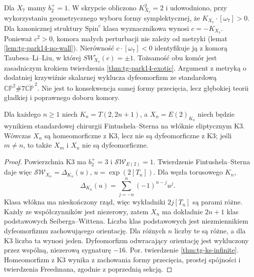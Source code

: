 \begin{przyklad}
Dla $X_7$ mamy $b_2^+=1$. W skrypcie obliczono
$K_{X_7}^2=2$ i udowodniono, przy wykorzystaniu
geometrycznego wyboru formy symplektycznej, że
$K_{X_7}\cdot[\omega_7]>0$. Dla kanonicznej struktury $\mathrm{Spin}^c$
klasa wyznacznikowa wynosi $c=-K_{X_7}$.
Ponieważ $c^2>0$, komora małych perturbacji
nie zależy od metryki (lemat
\ref{lem:tg-park14-no-wall}). Nierówność
$c\cdot[\omega_7]<0$ identyfikuje ją z komorą
Taubesa--Li--Liu, w której
$SW_{X_7}^{\circ}(c)=\pm1$.
Tożsamość obu komór jest zasadniczym krokiem
twierdzenia \ref{thm:tg-park14-exotic}. Argument z metryką
o dodatniej krzywiźnie skalarnej wyklucza dyfeomorfizm
ze standardową $\mathbb{CP}^2\#7\overline{\mathbb{CP}}^{\,2}$.
Nie jest to konsekwencja samej formy przecięcia, lecz
głębokiej teorii gładkiej i poprawnego doboru komory.
\end{przyklad}

\begin{twierdzenie}
\label{thm:tg-syn-k3}
Dla każdego $n\ge1$ niech $K_n=T(2,2n+1)$,
a $X_n=E(2)_{K_n}$ niech będzie wynikiem standardowej
chirurgii Fintushela--Sterna na włóknie eliptycznym K3.
Wówczas $X_n$ są homeomorficzne z K3, lecz nie są
dyfeomorficzne z K3; jeśli $m\ne n$,
to także $X_m$ i $X_n$ nie są dyfeomorficzne.
\end{twierdzenie}

\begin{proof}
Powierzchnia K3 ma $b_2^+=3$ i $\mathcal{SW}_{E(2)}=1$.
Twierdzenie Fintushela--Sterna daje więc
$\mathcal{SW}_{X_n}=\Delta_{K_n}(u)$,
$u=\exp(2[T_n])$. Dla węzła torusowego $K_n$,
\[
 \Delta_{K_n}(u)=\sum_{j=-n}^n(-1)^{n-j}u^j.
\]
Klasa włókna ma nieskończony rząd, więc wykładniki
$2j[T_n]$ są parami różne. Każdy ze współczynników
jest niezerowy, zatem $X_n$ ma dokładnie $2n+1$
klas podstawowych Seiberga--Wittena.
Liczba klas podstawowych jest niezmiennikiem
dyfeomorfizmu zachowującego orientację.
Dla różnych $n$ liczby te są różne, a dla K3
liczba ta wynosi jeden. Dyfeomorfizm odwracający
orientację jest wykluczony przez wspólną,
niezerową sygnaturę $-16$. Por. twierdzenie
\ref{thm:tg-ks-infinite}.
Homeomorfizm z K3 wynika z zachowania formy przecięcia,
prostej spójności i twierdzenia Freedmana, zgodnie
z poprzednią sekcją.
\end{proof}

